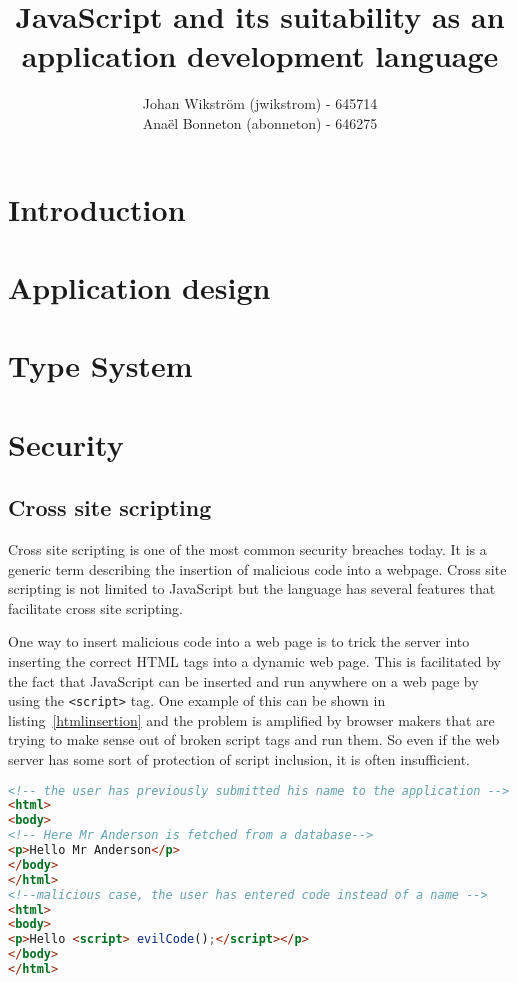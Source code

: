 \documentclass{report}
\title{JavaScript and its suitability as an application development language}
\author{Johan Wikström (jwikstrom) - 645714\\
Anaël Bonneton (abonneton) - 646275 
}
\begin{document}
\maketitle
\tableofcontents

\section{Introduction}


\section{Application design}



\section{Type System}

\section{Security}
\subsection{Cross site scripting}
Cross site scripting is one of the most common security breaches today. It is a generic term describing the insertion of malicious code into a webpage. Cross site scripting is not limited to JavaScript but the language has several features that facilitate cross site scripting.

One way to insert malicious code into a web page is to trick the server into inserting the correct HTML tags into a dynamic web page. This is facilitated by the fact that JavaScript can be inserted and run anywhere on a web page by using the \texttt{<script>} tag. One example of this can be shown in listing~\ref{htmlinsertion} and the problem is amplified by browser makers that are trying to make sense out of broken script tags and run them. So even if the web server has some sort of protection of script inclusion, it is often insufficient.
\begin{lstlisting}[caption={Insertion of malicious script on the server side},label={htmlinsertion},language={html}]
<!-- the user has previously submitted his name to the application -->
<html>
<body>
<!-- Here Mr Anderson is fetched from a database-->
<p>Hello Mr Anderson</p> 
</body>
</html>
<!--malicious case, the user has entered code instead of a name -->
<html>
<body>
<p>Hello <script> evilCode();</script></p>
</body>
</html>
\end{lstlisting}
\end{document}
